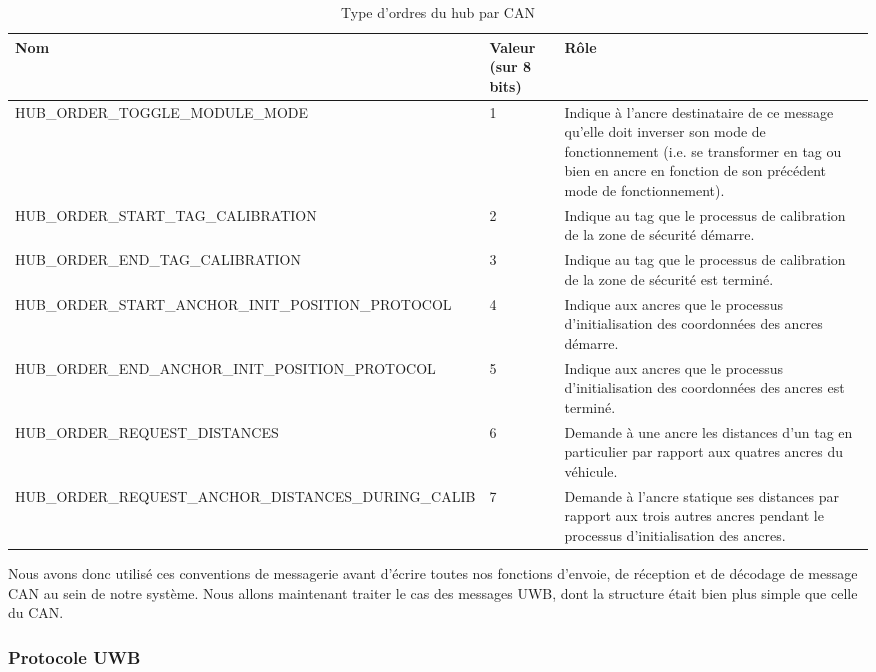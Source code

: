 \begin{table}[H]
    \centering
    \begin{tabular}{|p{5cm}|l|p{7.5cm}|}
        \hline
        \textbf{Nom} & \textbf{Valeur (sur 8 bits)} & \textbf{Rôle}\\
        \hline
        HUB\_ORDER\_TOGGLE\allowbreak\_MODULE\_MODE & 1 & Indique à l'ancre destinataire de ce message qu'elle doit inverser son mode de fonctionnement (i.e. se transformer en tag ou bien en ancre en fonction de son précédent mode de fonctionnement).\\
        \hline
        HUB\_ORDER\_START\allowbreak\_TAG\_CALIBRATION & 2 & Indique au tag que le processus de calibration de la zone de sécurité démarre.\\
        \hline
        HUB\_ORDER\_END\allowbreak\_TAG\_CALIBRATION & 3 & Indique au tag que le processus de calibration de la zone de sécurité est terminé.\\
        \hline
        HUB\_ORDER\_START\_ANCHOR\allowbreak\_INIT\_POSITION\_PROTOCOL & 4 & Indique aux ancres que le processus d'initialisation des coordonnées des ancres démarre.\\
        \hline
        HUB\_ORDER\_END\_ANCHOR\allowbreak\_INIT\_POSITION\_PROTOCOL & 5 & Indique aux ancres que le processus d'initialisation des coordonnées des ancres est terminé.\\
        \hline
        HUB\_ORDER\_REQUEST\allowbreak\_DISTANCES & 6 & Demande à une ancre les distances d'un tag en particulier par rapport aux quatres ancres du véhicule.\\
        \hline
        HUB\_ORDER\_REQUEST\allowbreak\_ANCHOR\_DISTANCES\allowbreak\_DURING\_CALIB & 7 & Demande à l'ancre statique ses distances par rapport aux trois autres ancres pendant le processus d'initialisation des ancres.\\
        \hline
    \end{tabular}
    \caption{Type d'ordres du hub par CAN}
\end{table}

Nous avons donc utilisé ces conventions de messagerie avant d'écrire toutes nos fonctions d'envoie, de réception et de décodage de message CAN au sein de notre système. Nous allons maintenant traiter le cas des messages UWB, dont la structure était bien plus simple que celle du CAN.

\subsubsection{Protocole UWB}

